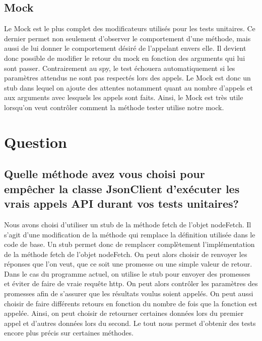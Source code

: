 \documentclass{article}
\begin{document}
\subsection*{Mock}
Le Mock est le plus complet des modificateurs utilisés pour les tests unitaires.
Ce dernier permet non seulement d'observer le comportement d'une méthode, mais aussi de lui donner le comportement désiré de l'appelant envers elle.
Il devient donc possible de modifier le retour du mock en fonction des arguments qui lui sont passer.
Contrairement au spy, le test échouera automatiquement si les paramètres attendus ne sont pas respectés lors des appels.
Le Mock est donc un stub dans lequel on ajoute des attentes notamment quant au nombre d'appels et aux arguments avec lesquels les appels sont faits.
Ainsi, le Mock est très utile lorsqu'on veut contrôler comment la méthode tester utilise notre mock.
\section*{Question}
\subsection*{Quelle méthode avez vous choisi pour empêcher la classe JsonClient d’exécuter
  les vrais appels API durant vos tests unitaires?}
	Nous avons choisi d'utiliser un stub de la méthode fetch de l'objet nodeFetch.
	Il s'agit d'une modification de la méthode qui remplace la définition utilisée dans le code de base.
	Un stub permet donc de remplacer complètement l'implémentation de la méthode fetch de l'objet nodeFetch.
	On peut alors choisir de renvoyer les réponses que l'on veut, que ce soit une promesse ou une simple valeur de retour.
	Dans le cas du programme actuel, on utilise le stub pour envoyer des promesses et éviter de faire de vraie requête http.
	On peut alors contrôler les paramètres des promesses afin de s'assurer que les résultats voulus soient appelés.
	On peut aussi choisir de faire différents retours en fonction du nombre de fois que la fonction est appelée.
	Ainsi, on peut choisir de retourner certaines données lors du premier appel et d'autres données lors du second.
	Le tout nous permet d'obtenir des tests encore plus précis sur certaines méthodes.
\end{document}
